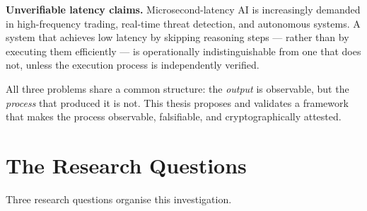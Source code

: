 \textbf{Unverifiable latency claims.}
Microsecond-latency AI is increasingly demanded in high-frequency trading, real-time
threat detection, and autonomous systems.
A system that achieves low latency by skipping reasoning steps --- rather than by
executing them efficiently --- is operationally indistinguishable from one that does not,
unless the execution process is independently verified.

All three problems share a common structure: the \emph{output} is observable, but the
\emph{process} that produced it is not.
This thesis proposes and validates a framework that makes the process observable, falsifiable,
and cryptographically attested.

\section{The Research Questions}
\label{sec:research-questions}

Three research questions organise this investigation.


